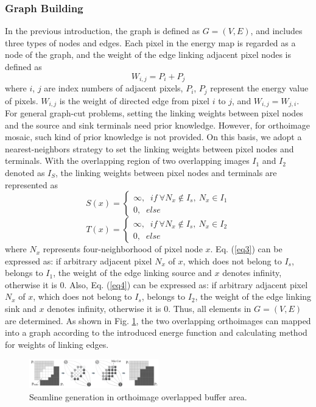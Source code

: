\documentclass[journal]{IEEEtran}
\begin{document}
\subsubsection{Graph Building}
In the previous introduction, the graph is defined as $G=\left(V, E \right)$, and includes three types of nodes and edges. Each pixel in the energy map is regarded as a node of the graph, and the weight of the edge linking adjacent pixel nodes is defined as
\begin{equation}\label{eq2}
W_{i,j}=P_{i}+P_{j}
\end{equation}
where $i$, $j$ are index numbers of adjacent pixels, $P_i$, $P_j$ represent the energy value of pixels. $W_{i,j}$ is the weight of directed edge from pixel $i$ to $j$, and $W_{i,j}=W_{j,i}$. For general graph-cut problems, setting the linking weights between pixel nodes and the source and sink terminals need prior knowledge. However, for orthoimage mosaic, such kind of prior knowledge is not provided. On this basis, we adopt a nearest-neighbors strategy to set the linking weights between pixel nodes and terminals. With the overlapping region of two overlapping images $I_1$ and $I_2$ denoted as $I_S$, the linking weights between pixel nodes and terminals are represented as
\begin{equation}\label{eq3}
S(x)= \left\{ {\begin{array}{*{20}{c}}
	{\infty,\;\;if~\forall N_{x}\notin I_{s},~N_{x}\in I_{1}}\\
	{0 ,\;\;else}
	\end{array}} \right.
\end{equation}
\begin{equation}\label{eq4}
T(x)= \left\{ {\begin{array}{*{20}{c}}
	{\infty,\;\;if~\forall N_{x}\notin I_{s},~N_{x}\in I_{2}}\\
	{0 ,\;\;else}
	\end{array}} \right.
\end{equation}
where $N_x$ represents four-neighborhood of pixel node $x$. Eq. (\ref{eq3}) can be expressed as: if arbitrary adjacent pixel $N_x$ of $x$, which does not belong to $I_s$, belongs to $I_1$, the weight of the edge linking source and $x$ denotes infinity, otherwise it is 0. Also, Eq. (\ref{eq4}) can be expressed as: if arbitrary adjacent pixel $N_x$ of $x$, which does not belong to $I_s$, belongs to $I_2$, the weight of the edge linking sink and $x$ denotes infinity, otherwise it is 0. Thus, all elements in $G= (V, E)$ are determined. As shown in Fig. \ref{fig:link}, the two overlapping orthoimages can mapped into a graph according to the introduced energe function and calculating method for weights of linking edges.
\begin{figure}[!t]
	\centering
	\includegraphics[width=0.5\textwidth]{link}
	\caption{Seamline generation in orthoimage overlapped buffer area.}
	\label{fig:link}
\end{figure}
\end{document}

